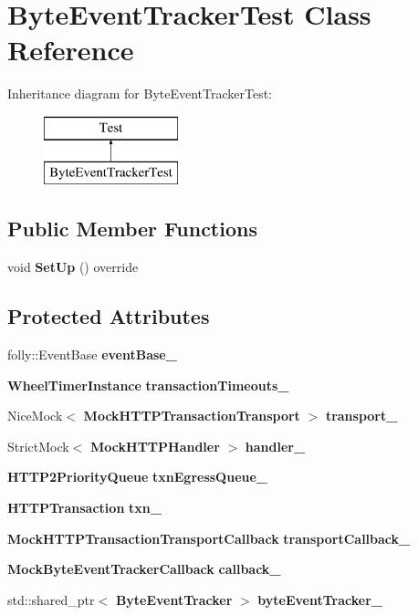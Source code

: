 \section{Byte\+Event\+Tracker\+Test Class Reference}
\label{classByteEventTrackerTest}
Inheritance diagram for Byte\+Event\+Tracker\+Test\+:\begin{figure}[H]
\begin{center}
\leavevmode
\includegraphics[height=2.000000cm]{classByteEventTrackerTest}
\end{center}
\end{figure}
\subsection*{Public Member Functions}
\begin{DoxyCompactItemize}
\item 
void {\bf Set\+Up} () override
\end{DoxyCompactItemize}
\subsection*{Protected Attributes}
\begin{DoxyCompactItemize}
\item 
folly\+::\+Event\+Base {\bf event\+Base\+\_\+}
\item 
{\bf Wheel\+Timer\+Instance} {\bf transaction\+Timeouts\+\_\+}
\item 
Nice\+Mock$<$ {\bf Mock\+H\+T\+T\+P\+Transaction\+Transport} $>$ {\bf transport\+\_\+}
\item 
Strict\+Mock$<$ {\bf Mock\+H\+T\+T\+P\+Handler} $>$ {\bf handler\+\_\+}
\item 
{\bf H\+T\+T\+P2\+Priority\+Queue} {\bf txn\+Egress\+Queue\+\_\+}
\item 
{\bf H\+T\+T\+P\+Transaction} {\bf txn\+\_\+}
\item 
{\bf Mock\+H\+T\+T\+P\+Transaction\+Transport\+Callback} {\bf transport\+Callback\+\_\+}
\item 
{\bf Mock\+Byte\+Event\+Tracker\+Callback} {\bf callback\+\_\+}
\item 
std\+::shared\+\_\+ptr$<$ {\bf Byte\+Event\+Tracker} $>$ {\bf byte\+Event\+Tracker\+\_\+}
\end{DoxyCompactItemize}


